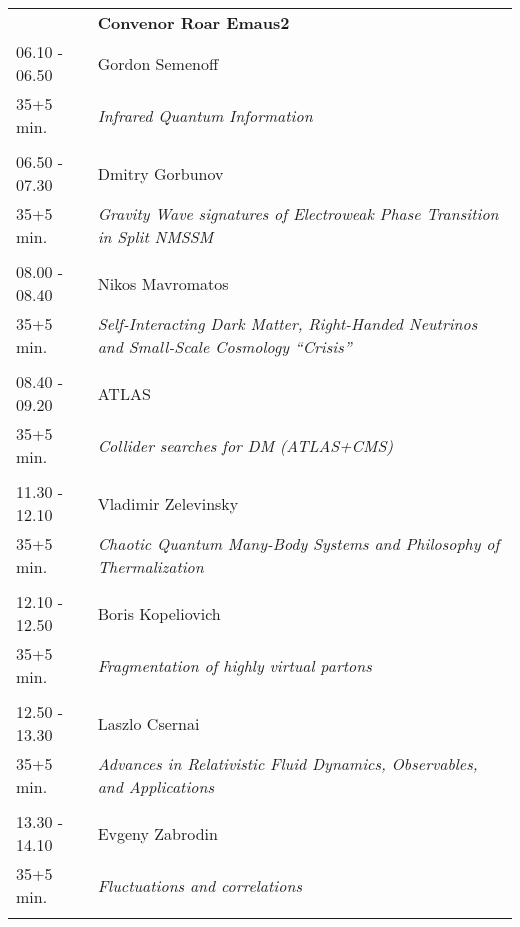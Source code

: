 \begin{longtable}{p{3cm}p{13cm}}
&\hfill {\bf Convenor Roar Emaus2 }\\ 
06.10 - 06.50 & Gordon Semenoff\\ 
35+5 min. & {\it Infrared Quantum Information}\\ 
 & \\ 
06.50 - 07.30 & Dmitry Gorbunov\\ 
35+5 min. & {\it Gravity Wave signatures of Electroweak Phase Transition in Split NMSSM}\\ 
 & \\ 
08.00 - 08.40 & Nikos Mavromatos\\ 
35+5 min. & {\it Self-Interacting Dark Matter, Right-Handed Neutrinos and Small-Scale Cosmology ``Crisis''}\\ 
 & \\ 
08.40 - 09.20 & ATLAS\\ 
35+5 min. & {\it Collider searches for DM (ATLAS+CMS)}\\ 
 & \\ 
11.30 - 12.10 & Vladimir Zelevinsky\\ 
35+5 min. & {\it Chaotic Quantum Many-Body Systems and Philosophy of Thermalization}\\ 
 & \\ 
12.10 - 12.50 & Boris Kopeliovich\\ 
35+5 min. & {\it Fragmentation of highly virtual partons}\\ 
 & \\ 
12.50 - 13.30 & Laszlo Csernai\\ 
35+5 min. & {\it Advances in Relativistic Fluid Dynamics, Observables, and Applications}\\ 
 & \\ 
13.30 - 14.10 & Evgeny Zabrodin\\ 
35+5 min. & {\it Fluctuations and correlations}\\ 
 & \\ 
\end{longtable}

